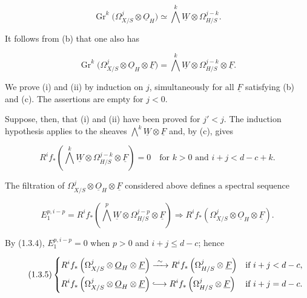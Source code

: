 \begin{equation}\tag{1.3.2}
\operatorname{Gr}^k\bigl(\Omega^j_{X/S}\otimes\underline O_H\bigr)
\simeq\bigwedge^k\underline W\otimes\Omega^{j-k}_{H/S}.
\end{equation}

It follows from (b) that one also has

\begin{equation}\tag{1.3.3}
\operatorname{Gr}^k\bigl(\Omega^j_{X/S}\otimes\underline O_H
\otimes\underline F\bigr)
=\bigwedge^k\underline W\otimes\Omega^{j-k}_{H/S}
\otimes\underline F.
\end{equation}

We prove (i) and (ii) by induction on $j$, simultaneously for all
$\underline F$ satisfying (b) and (c).  The assertions are empty for
$j<0$.


Suppose, then, that (i) and (ii) have been proved for $j'<j$.  The
induction hypothesis applies to the sheaves
$\bigwedge^k\underline W\otimes\underline F$ and, by (c), gives

\begin{equation}\tag{1.3.4}
R^if_*\left(\bigwedge^k\underline W\otimes
\Omega^{j-k}_{H/S}\otimes\underline F\right)=0
\quad\text{for }k>0\text{ and }i+j<d-c+k.
\end{equation}

The filtration of
$\Omega^j_{X/S}\otimes\underline O_H\otimes\underline F$ considered
above defines a spectral sequence

\begin{equation*}
E_1^{p,i-p}=R^if_*\left(\bigwedge^p\underline W\otimes
\Omega^{j-p}_{H/S}\otimes\underline F\right)
\Longrightarrow
R^if_*\left(\Omega^j_{X/S}\otimes\underline O_H
\otimes\underline F\right).
\end{equation*}

By (1.3.4), $E_1^{p,i-p}=0$ when $p>0$ and $i+j\leq d-c$; hence

\begin{equation}\tag{1.3.5}
\left\{
\begin{aligned}
R^if_*\left(\Omega^j_{X/S}\otimes\underline O_H\otimes\underline F\right)
&\xrightarrow{\ \sim\ }
R^if_*\left(\Omega^j_{H/S}\otimes\underline F\right)
&&\text{if }i+j<d-c,\\
R^if_*\left(\Omega^j_{X/S}\otimes\underline O_H\otimes\underline F\right)
&\lhook\joinrel\longrightarrow
R^if_*\left(\Omega^j_{H/S}\otimes\underline F\right)
&&\text{if }i+j=d-c.
\end{aligned}
\right.
\end{equation}

